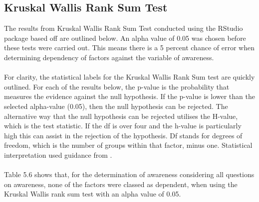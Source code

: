 \subsection{Kruskal Wallis Rank Sum Test}
The results from Kruskal Wallis Rank Sum Test conducted using the RStudio package based off \cite{hollander_nonparametric_2014} are outlined below.  An alpha value of 0.05 was chosen before these tests were carried out. This means there is a 5 percent chance of error when determining dependency of factors against the variable of awareness.
\paragraph{}
For clarity, the statistical labels for the Kruskal Wallis Rank Sum test are quickly outlined. For each of the results below, the p-value is the probability that measures the evidence against the null hypothesis.  If the p-value is lower than the selected alpha-value (0.05), then the null hypothesis can be rejected. The alternative way that the null hypothesis can be rejected utilises the H-value, which is the test statistic. If the df is over four and the h-value is particularly high this can assist in the rejection of the hypothesis. Df stands for degrees of freedom, which is the number of groups within that factor, minus one. Statistical interpretation used guidance from \cite{minitab_interpret_2022}.
\paragraph{}

Table 5.6 shows that, for the determination of awareness considering all questions on awareness, none of the factors were classed as dependent, when using the Kruskal Wallis rank sum test with an alpha value of 0.05. 

